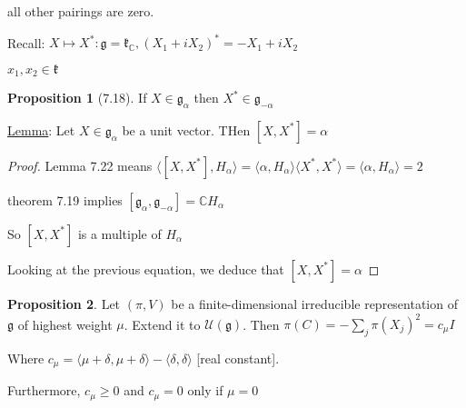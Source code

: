 \documentclass{article}
\theoremstyle{definition}
\newtheorem{proposition}{Proposition}
\begin{document}
all other pairings are zero.

Recall: \(X \mapsto X^{\ast} : \mathfrak{g} = \mathfrak{k}_\mathbb{C}, (X_1 + iX_2)^{\ast} = - X_1 + i X_2\)

\(x_1,x_2\in \mathfrak{k}\)

\begin{proposition}
    [7.18] If \(X\in \mathfrak{g}_{\alpha}\) then \(X^{\ast} \in \mathfrak{g}_{-\alpha}\)
    

    
\end{proposition}

\underline{Lemma}: Let \(X\in \mathfrak{g}_{\alpha}\) be a unit vector. THen \([X,X^{\ast}]=\alpha\)

\begin{proof}
    Lemma 7.22 means \(\langle [X,X^{\ast}], H_\alpha \rangle = \langle \alpha , H_\alpha \rangle \langle X^{\ast} ,X^{\ast} \rangle   = \langle \alpha ,H_\alpha \rangle =2\) 

    theorem 7.19 implies \([\mathfrak{g}_\alpha , \mathfrak{g}_{-\alpha} ]=\mathbb{C} H_\alpha\) 

    So \([X,X^{\ast}]\) is a multiple of \(H_\alpha\)
    
    Looking at the previous equation, we deduce that \([X,X^{\ast}]=\alpha\) 

\end{proof}

\begin{proposition}
    Let \((\pi , V)\) be a finite-dimensional irreducible representation of \(\mathfrak{g}\) of highest weight \(\mu\). Extend it to \(\mathcal{U}(\mathfrak{g})\). Then \(\pi(C)=-\sum_{j} \pi(X_j)^2 = c_\mu I\)
    
    Where \(c_\mu = \langle \mu + \delta , \mu + \delta \rangle - \langle \delta ,\delta  \rangle  \) [real constant].

    Furthermore, \(c_\mu \geq 0\) and \(c_\mu=0\) only if \(\mu =0  \)  
\end{proposition}
\end{document}
